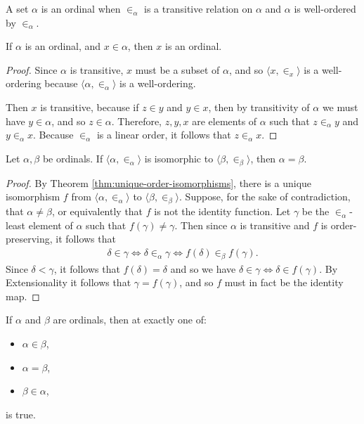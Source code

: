 \begin{defn}
    A set $\alpha$ is an ordinal when $\in_{\alpha}$ is a transitive relation on $\alpha$ and $\alpha$ is well-ordered by $\in_{\alpha}$.
\end{defn}

\begin{prop}
    If $\alpha$ is an ordinal, and $x \in \alpha$, then $x$ is an ordinal.
\end{prop}

\begin{proof}
    Since $\alpha$ is transitive, $x$ must be a subset of $\alpha$, and so $\langle x, \in_{x} \rangle$ is a well-ordering because $\langle \alpha, \in_{\alpha}\rangle$ is a well-ordering.

    Then $x$ is transitive, because if $z \in y$ and $y \in x$, then by transitivity of $\alpha$ we must have $y \in \alpha$, and so $z \in \alpha$. Therefore, $z, y, x$ are elements of $\alpha$ such that $z \in_{\alpha} y$ and $y \in_{\alpha} x$. Because $\in_{\alpha}$ is a linear order, it follows that $z \in_{\alpha} x$.
\end{proof}

\begin{thm}\label{thm:isomorphic-ordinals}
    Let $\alpha, \beta$ be ordinals. If $\langle \alpha, \in_{\alpha} \rangle$ is isomorphic to $\langle \beta, \in_{\beta} \rangle$, then $\alpha = \beta$.
\end{thm}

\begin{proof}
    By Theorem \ref{thm:unique-order-isomorphisms}, there is a unique isomorphism $f$ from $\langle \alpha, \in_{\alpha}\rangle$ to $\langle\beta, \in_{\beta}\rangle$. Suppose, for the sake of contradiction, that $\alpha \neq \beta$, or equivalently that $f$ is not the identity function. Let $\gamma$ be the $\in_{\alpha}$-least element of $\alpha$ such that $f(\gamma) \neq \gamma$. Then since $\alpha$ is transitive and $f$ is order-preserving, it follows that
    \begin{align*}
        \delta \in \gamma \iff \delta \in_{\alpha} \gamma \iff f(\delta) \in_{\beta} f(\gamma).
    \end{align*}
    Since $\delta < \gamma$, it follows that $f(\delta) = \delta$ and so we have $\delta \in \gamma \iff \delta \in f(\gamma)$. By Extensionality it follows that $\gamma = f(\gamma)$, and so $f$ must in fact be the identity map.
\end{proof}

\begin{lemma}\label{lemma:ordinal-linear-order}
    If $\alpha$ and $\beta$ are ordinals, then at exactly one of:
    \begin{itemize}
        \item $\alpha \in \beta$,
        \item $\alpha = \beta$,
        \item $\beta \in \alpha$,
    \end{itemize}
    is true.
\end{lemma}

